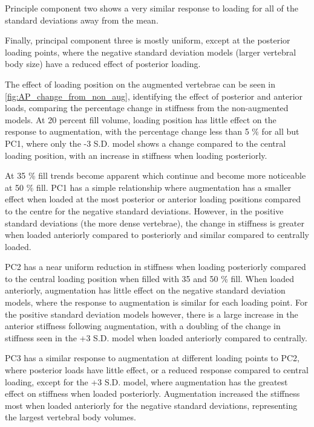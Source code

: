 Principle component two shows a very similar response to loading for all of the
standard deviations away from the mean.

Finally, principal component three is mostly uniform, except at the posterior
loading points, where the negative standard deviation models (larger vertebral
body size) have a reduced effect of posterior loading.


The effect of loading position on the augmented vertebrae can be seen in
\cref{fig:AP_change_from_non_aug}, identifying the effect of posterior and
anterior loads, comparing the percentage change in stiffness from the
non-augmented models.  At 20 percent fill volume, loading position has little
effect on the response to augmentation, with the percentage change less than 5
\% for all but PC1, where only the -3 S.D. model shows a change compared to the
central loading position, with an increase in stiffness when loading
posteriorly.

At 35 \% fill trends become apparent which continue and become more noticeable
at 50 \% fill.  PC1 has a simple relationship where augmentation has a smaller
effect when loaded at the most posterior or anterior loading positions compared
to the centre for the negative standard deviations.  However, in the positive
standard deviations (the more dense vertebrae), the change in stiffness is
greater when loaded anteriorly compared to posteriorly and similar compared to
centrally loaded.

PC2 has a near uniform reduction in stiffness when loading posteriorly compared
to the central loading position when filled with 35 and 50 \% fill.  When
loaded anteriorly, augmentation has little effect on the negative standard
deviation models, where the response to augmentation is similar for each
loading point.  For the positive standard deviation models however, there is a
large increase in the anterior stiffness following augmentation, with a
doubling of the change in stiffness seen in the +3 S.D. model when loaded
anteriorly compared to centrally.

PC3 has a similar response to augmentation at different loading points to PC2,
where posterior loads have little effect, or a reduced response compared to
central loading, except for the +3 S.D. model, where augmentation has the
greatest effect on stiffness when loaded posteriorly.  Augmentation increased
the stiffness most when loaded anteriorly for the negative standard deviations,
representing the largest vertebral body volumes.

